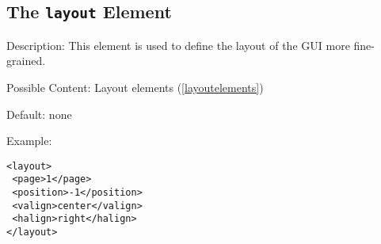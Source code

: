 \subsection{ The \texttt{layout} Element}
\label{layout}
\begin{description}
 \item Description: This element is used to define the layout of the GUI more fine-grained.

 \item Possible Content: Layout elements (\ref{layoutelements})

 \item Default: none

 \item Example: 

\begin{lstlisting}[caption=\texttt{layout} Element]
<layout>
 <page>1</page>
 <position>-1</position>
 <valign>center</valign>
 <halign>right</halign>
</layout>
\end{lstlisting}
\end{description}